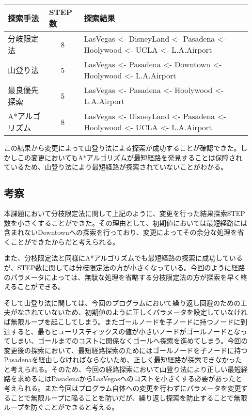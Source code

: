 \documentclass[a4j]{jarticle}
\begin{document}
\begin{table}[ht]
\begin{tabular}{|l|c|l|}
\hline
探索手法 & \multicolumn{1}{l|}{STEP数} & 探索結果                                                                                                                     \\ \hline
分岐限定法 & 8 & LasVegas \textless{}- DisneyLand \textless{}- Pasadena \textless{}- Hoolywood \textless{}- UCLA \textless{}- L.A.Airport  \\ \hline
山登り法 & 5 & LasVegas \textless{}- Pasadena \textless{}- Downtown \textless{}- Hoolywood  \textless{}- L.A.Airport  \\ \hline
最良優先探索 & 5 & LasVegas \textless{}- Pasadena \textless{}- Hoolywood \textless{}- L.A.Airport                   \\ \hline
A*アルゴリズム & 8 & LasVegas \textless{}- DisneyLand \textless{}- Pasadena \textless{}- Hoolywood \textless{}- UCLA \textless{}- L.A.Airport \\ \hline
\end{tabular}
\end{table}

この結果から変更によって山登り法による探索が成功することが確認できた。しかしこの変更においてもA*アルゴリズムが最短経路を発見することは保障されているため、山登り法により最短経路が探索されていないことがわかる。
\subsection{考察}

本課題において分枝限定法に関して上記のように、変更を行った結果探索STEP数を小さくすることができた。その理由として、初期値においては最短経路には含まれないDowntownへの探索を行っており、変更によってその余分な処理を省くことができたからだと考えられる。

また、分枝限定法と同様にA*アルゴリズムでも最短経路の探索に成功しているが、STEP数に関しては分枝限定法の方が小さくなっている。今回のように経路のパラメータによっては、無駄な処理を省略する分枝限定法の方が探索を早く終えることができる。

そして山登り法に関しては、今回のプログラムにおいて繰り返し回避のための工夫がなされていないため、初期値のように正しくパラメータを設定していなければ無限ループを起こしてしまう。またゴールノードを子ノードに持つノードに到達すると、最もヒューリスティックスの値が小さいノードがゴールノードとなってしまい、ゴールまでのコストに関係なくゴールへ探索を進めてしまう。今回の変更後の探索において、最短経路探索のためにはゴールノードを子ノードに持つPasadenaを経由しなければならないため、正しく最短経路が探索できなかったと考えられる。そのため、今回の経路探索において山登り法により正しい最短経路を求めるにはPasadenaからLasVegasへのコストを小さくする必要があったと考えられる。また今回はプログラム自体への変更を行わずにパラメータを変更することで無限ループに陥ることを防いだが、繰り返し探索を防止することで無限ループを防ぐことができると考える。
\end{document}
